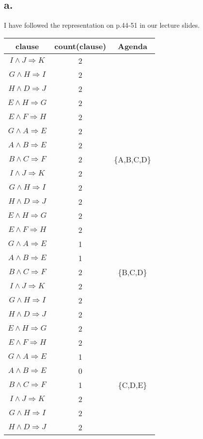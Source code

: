 \documentclass[12pt]{article}
\begin{document}
\subsection*{a.}
I have followed the representation on p.44-51 in our lecture slides.
\begin{table}[H]
\small
\centering
\label{table:example}
\begin{tabular}
{|c|c|c|}	%
\hline 							%
\textbf{clause} & \textbf{count(clause)} & \textbf{Agenda}\\
\hline
$I \wedge J \Rightarrow K$ & 2 &\\
$G \wedge H \Rightarrow I$ & 2 &\\
$H \wedge D \Rightarrow J$ & 2 &\\
$E \wedge H \Rightarrow G$ & 2 &\\
$E \wedge F \Rightarrow H$ & 2 &\\
$G \wedge A \Rightarrow E$ & 2 &\\
$A \wedge B \Rightarrow E$ & 2 &\\
$B \wedge C \Rightarrow F$ & 2 & \{A,B,C,D\}\\
\hline
$I \wedge J \Rightarrow K$ & 2 &\\
$G \wedge H \Rightarrow I$ & 2 &\\
$H \wedge D \Rightarrow J$ & 2 &\\
$E \wedge H \Rightarrow G$ & 2 &\\
$E \wedge F \Rightarrow H$ & 2 &\\
$G \wedge A \Rightarrow E$ & 1 &\\
$A \wedge B \Rightarrow E$ & 1 &\\
$B \wedge C \Rightarrow F$ & 2 & \{B,C,D\}\\
\hline
$I \wedge J \Rightarrow K$ & 2 &\\
$G \wedge H \Rightarrow I$ & 2 &\\
$H \wedge D \Rightarrow J$ & 2 &\\
$E \wedge H \Rightarrow G$ & 2 &\\
$E \wedge F \Rightarrow H$ & 2 &\\
$G \wedge A \Rightarrow E$ & 1 &\\
$A \wedge B \Rightarrow E$ & 0 &\\
$B \wedge C \Rightarrow F$ & 1 & \{C,D,E\}\\
\hline
$I \wedge J \Rightarrow K$ & 2 &\\
$G \wedge H \Rightarrow I$ & 2 &\\
$H \wedge D \Rightarrow J$ & 2 &\\

\end{tabular}
\end{table}
\end{document}
